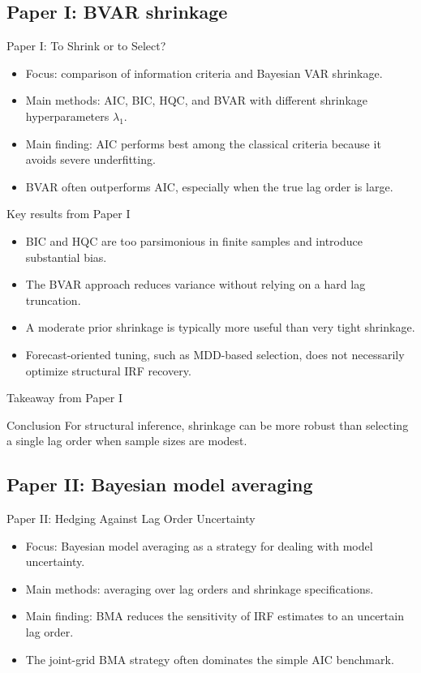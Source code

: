 \documentclass[aspectratio=169]{beamer}
\begin{document}
\subsection{Paper I: BVAR shrinkage}

\begin{frame}{Paper I: To Shrink or to Select?}
  \begin{itemize}
    \item Focus: comparison of information criteria and Bayesian VAR shrinkage.
    \item Main methods: AIC, BIC, HQC, and BVAR with different shrinkage hyperparameters $\lambda_1$.
    \item Main finding: AIC performs best among the classical criteria because it avoids severe underfitting.
    \item BVAR often outperforms AIC, especially when the true lag order is large.
  \end{itemize}
\end{frame}

\begin{frame}{Key results from Paper I}
  \begin{itemize}
    \item BIC and HQC are too parsimonious in finite samples and introduce substantial bias.
    \item The BVAR approach reduces variance without relying on a hard lag truncation.
    \item A moderate prior shrinkage is typically more useful than very tight shrinkage.
    \item Forecast-oriented tuning, such as MDD-based selection, does not necessarily optimize structural IRF recovery.
  \end{itemize}
\end{frame}

\begin{frame}{Takeaway from Paper I}
  \begin{block}{Conclusion}
    For structural inference, shrinkage can be more robust than selecting a single lag order when sample sizes are modest.
  \end{block}
\end{frame}

\subsection{Paper II: Bayesian model averaging}

\begin{frame}{Paper II: Hedging Against Lag Order Uncertainty}
  \begin{itemize}
    \item Focus: Bayesian model averaging as a strategy for dealing with model uncertainty.
    \item Main methods: averaging over lag orders and shrinkage specifications.
    \item Main finding: BMA reduces the sensitivity of IRF estimates to an uncertain lag order.
    \item The joint-grid BMA strategy often dominates the simple AIC benchmark.
  \end{itemize}
\end{frame}
\end{document}
